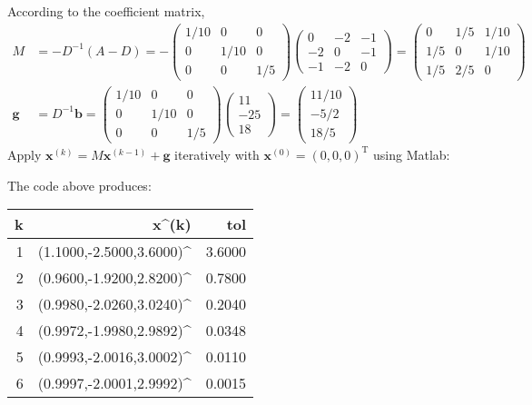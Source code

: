 \documentclass[10pt]{report}
\begin{document}
\begin{enumerate}
\begin{enumerate}
		According to the coefficient matrix,
		\begin{align*}
			M &= -D^{-1}(A-D) = -\begin{pmatrix}
			1/10 & 0 & 0\\
			0 & 1/10 & 0\\
			0 & 0 & 1/5
			\end{pmatrix}
			\begin{pmatrix}
			0 & -2 & -1\\
			-2 & 0 & -1\\
			-1 & -2 & 0
			\end{pmatrix}
			=
			\begin{pmatrix}
			0 & 1/5 & 1/10\\
			1/5 & 0 & 1/10\\
			1/5 & 2/5 & 0
			\end{pmatrix}
			\\
			\mathbf{g} &= D^{-1}\mathbf{b} = \begin{pmatrix}
			1/10 & 0 & 0\\
			0 & 1/10 & 0\\
			0 & 0 & 1/5
			\end{pmatrix}
			\begin{pmatrix}
			11\\
			-25\\
			18
			\end{pmatrix}
			=
			\begin{pmatrix}
			11/10\\
			-5/2\\
			18/5
			\end{pmatrix}
		\end{align*}
		Apply $\mathbf{x}^{(k)} = M\mathbf{x}^{(k-1)} + \mathbf{g}$ iteratively with $\mathbf{x}^{(0)} = (0, 0, 0)^\mathrm{T}$ using Matlab:
		
		The code above produces:
		\begin{table}[H]
			\centering
			\begin{tabular}{NNN} \toprule
				k & x^{(k)} & tol \\  & (1.1000,-2.5000,3.6000)^ & 3.6000\\
				2 & (0.9600,-1.9200,2.8200)^ & 0.7800\\
				3 & (0.9980,-2.0260,3.0240)^ & 0.2040\\
				4 & (0.9972,-1.9980,2.9892)^ & 0.0348\\
				5 & (0.9993,-2.0016,3.0002)^ & 0.0110\\
				6 & (0.9997,-2.0001,2.9992)^ & 0.0015\\
				\bottomrule
			\end{tabular}
		\end{table}
		

\end{enumerate}
\end{enumerate}
\end{document}
